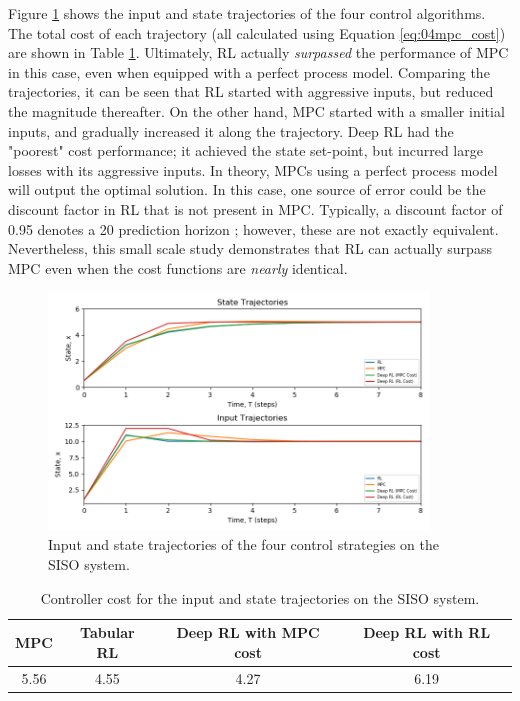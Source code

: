Figure \ref{fig:04SISOcomp} shows the input and state trajectories of the four control algorithms. The total cost of each trajectory (all calculated using Equation \ref{eq:04mpc_cost}) are shown in Table \ref{tab:04SISOCost}. Ultimately, RL actually \textit{surpassed} the performance of MPC in this case, even when equipped with a perfect process model. Comparing the trajectories, it can be seen that RL started with aggressive inputs, but reduced the magnitude thereafter.  On the other hand, MPC started with a smaller initial inputs, and gradually increased it along the trajectory. Deep RL had the "poorest" cost performance; it achieved the state set-point, but incurred large losses with its aggressive inputs. In theory, MPCs using a perfect process model will output the optimal solution.  In this case, one source of error could be the discount factor in RL that is not present in MPC. Typically, a discount factor of 0.95 denotes a 20 prediction horizon \cite{deeplearning_course}; however, these are not exactly equivalent. Nevertheless, this small scale study demonstrates that RL can actually surpass MPC even when the cost functions are \textit{nearly} identical.  

\begin{figure}[H]
    \centering
    \includegraphics[width=0.9\textwidth]{images/ch4/States_and_Inputs_SISO2.png}
    \caption{Input and state trajectories of the four control strategies on the SISO system.}
    \label{fig:04SISOcomp}
\end{figure}

\begin{table}[H]
\caption{Controller cost for the input and state trajectories on the SISO system.}
\label{tab:04SISOCost}
\centering
\begin{tabular}{c|c|c|c}
\textbf{MPC} & \textbf{Tabular RL} & \textbf{Deep RL with MPC cost}& \textbf{Deep RL with RL cost} \\
\hline
5.56	     & 4.55	               & 4.27                         & 6.19	 \\
\end{tabular}
\end{table}







